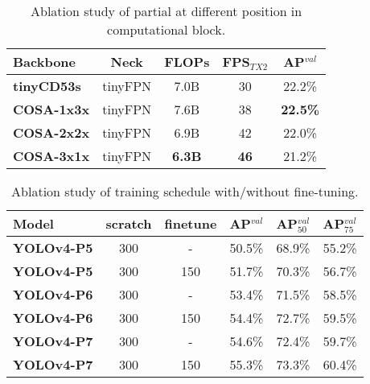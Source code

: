 \documentclass[10pt,twocolumn,letterpaper]{article}
\begin{document}
\begin{table}[t]
	\centering
	\begin{threeparttable}[h]
		\footnotesize
		\caption{Ablation study of partial at different position in computational block.}
		\label{table:t10}
		\setlength\tabcolsep{3.5pt}
		\begin{tabular}{lcccc}
			\toprule
			\textbf{Backbone} & \textbf{Neck} & \textbf{FLOPs} & \textbf{FPS$_{TX2}$} & \textbf{AP$^{val}$} \\				
			\midrule
			\textbf{tinyCD53s} & tinyFPN & 7.0B & 30 & 22.2\% \\
			\textbf{COSA-1x3x} & tinyFPN & 7.6B & 38 & \textbf{22.5\%} \\
			\textbf{COSA-2x2x} & tinyFPN & 6.9B & 42 & 22.0\% \\
			\textbf{COSA-3x1x} & tinyFPN & \textbf{6.3B} & \textbf{46} & 21.2\% \\
			\bottomrule
		\end{tabular}
	\end{threeparttable}
\end{table}

\begin{table}[t]
	\centering
	\begin{threeparttable}[h]
		\footnotesize
		\caption{Ablation study of training schedule with/without fine-tuning.}
		\label{table:t11}
		\setlength\tabcolsep{3.5pt}
		\begin{tabular}{lccccc}
			\toprule
			\textbf{Model} & \textbf{scratch} & \textbf{finetune} & \textbf{AP$^{val}$} & \textbf{AP$^{val}_{50}$} & \textbf{AP$^{val}_{75}$} \\				
			\midrule
			\textbf{YOLOv4-P5} & 300 & - & 50.5\% & 68.9\% & 55.2\% \\
			\textbf{YOLOv4-P5} & 300 & 150 & 51.7\% & 70.3\% & 56.7\% \\
			\textbf{YOLOv4-P6} & 300 & - & 53.4\% & 71.5\% & 58.5\% \\
			\textbf{YOLOv4-P6} & 300 & 150 & 54.4\% & 72.7\% & 59.5\% \\
			\textbf{YOLOv4-P7} & 300 & - & 54.6\% & 72.4\% & 59.7\% \\
			\textbf{YOLOv4-P7} & 300 & 150 & 55.3\% & 73.3\% & 60.4\% \\
			\bottomrule
		\end{tabular}
	\end{threeparttable}
\end{table}
\end{document}
